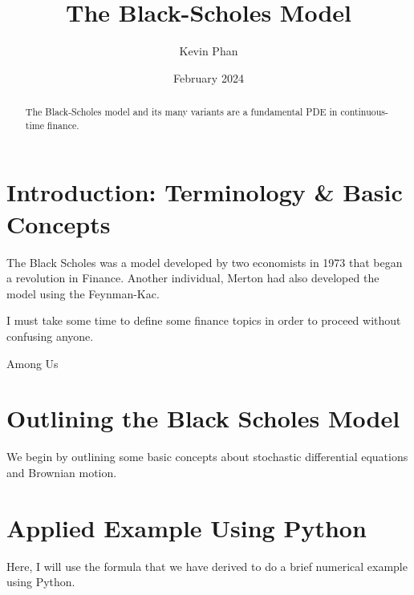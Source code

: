 \documentclass{article}
\title{The Black-Scholes Model}
\author{Kevin Phan}
\date{February 2024}
\begin{document}
\maketitle

\begin{abstract}
    The Black-Scholes model and its many variants are a fundamental PDE in continuous-time finance. 
\end{abstract}

\section{Introduction: Terminology \& Basic Concepts}

The Black Scholes was a model developed by two economists in 1973 that began a revolution in Finance.
Another individual, Merton had also developed the model using the Feynman-Kac. 


I must take some time to define some finance topics in order to proceed without confusing anyone.

Among Us

\section{Outlining the Black Scholes Model}
We begin by outlining some basic concepts about stochastic differential equations and Brownian motion. 

\section{Applied Example Using Python}

Here, I will use the formula that we have derived to do a brief numerical example using Python.
\end{document}
